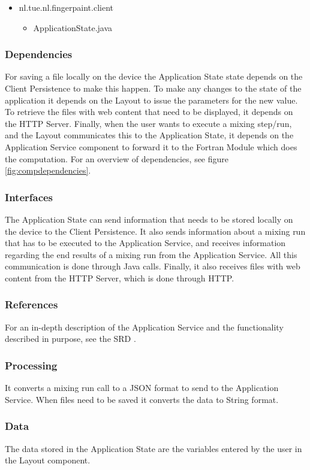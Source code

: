 \fpstartparagraph{} \begin{itemize}
	\item nl.tue.nl.fingerpaint.client
	\begin{itemize}
		\item ApplicationState.java
	\end{itemize}
\end{itemize}

\subsubsection*{Dependencies}
For saving a file locally on the device the Application State state depends on the Client Persistence to make this happen. To make any changes to the state of the application it depends on the Layout to issue the parameters for the new value. To retrieve the files with web content that need to be displayed, it depends on the HTTP Server. Finally, when the user wants to execute a mixing step/run, and the Layout communicates this to the Application State, it depends on the Application Service component to forward it to the Fortran Module which does the computation. For an overview of dependencies, see figure \ref{fig:compdependencies}.

\subsubsection*{Interfaces}
The Application State can send information that needs to be stored locally on the device to the Client Persistence. It also sends information about a mixing run that has to be executed to the Application Service, and receives information regarding the end results of a mixing run from the Application Service. All this communication is done through Java calls. Finally, it also receives files with web content from the HTTP Server, which is done through HTTP.

\subsubsection*{References}
For an in-depth description of the Application Service and the functionality described in purpose, see the SRD \cite{srd}.

\subsubsection*{Processing}
It converts a mixing run call to a JSON format to send to the Application Service. When files need to be saved it converts the data to String format.

\subsubsection*{Data}
The data stored in the Application State are the variables entered by the user in the Layout component.
